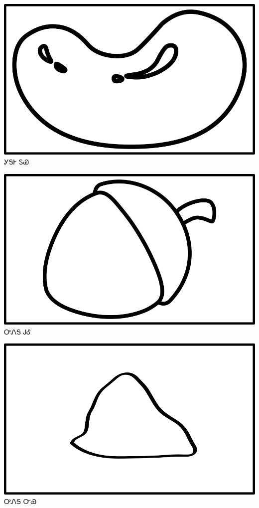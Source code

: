 \documentclass[avery5371]{flashcards}%
\begin{document}
    \begin{flashcard}{
        \includegraphics[width=0.95\columnwidth,height=.51\columnwidth,keepaspectratio]{../artwork/objects-neutral/tuya}
    }
        \Huge ᎩᎦᎨ ᏚᏯ
    \end{flashcard}

    \begin{flashcard}{
        \includegraphics[width=0.95\columnwidth,height=.51\columnwidth,keepaspectratio]{../artwork/objects-neutral/gule}
    }
        \Huge ᎤᏁᎦ ᎫᎴ
    \end{flashcard}

    \begin{flashcard}{
        \includegraphics[width=0.95\columnwidth,height=.51\columnwidth,keepaspectratio]{../artwork/objects-neutral/nvya}
    }
        \Huge ᎤᏁᎦ ᏅᏯ
    \end{flashcard}
\end{document}
